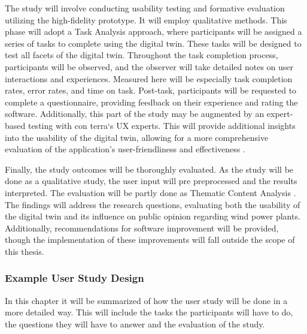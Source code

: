 \documentclass[11pt, titlepage, a4paper]{scrartcl}
\begin{document}
\begin{linenumbers}

    The study will involve conducting usability testing and formative evaluation utilizing the high-fidelity prototype. It will employ qualitative methods. This phase will adopt a Task Analysis approach, where participants will be assigned a series of tasks to complete using the digital twin. These tasks will be designed to test all facets of the digital twin. Throughout the task completion process, participants will be observed, and the observer will take detailed notes on user interactions and experiences. Measured here will be especially task completion rates, error rates, and time on task.
    Post-task, participants will be requested to complete a questionnaire, providing feedback on their experience and rating the software. Additionally, this part of the study may be augmented by an expert-based testing with con terra`s UX experts. This will provide additional insights into the usability of the digital twin, allowing for a more comprehensive evaluation of the application's user-friendliness and effectiveness \cite{lazarResearchMethodsHuman2017}.


    Finally, the study outcomes will be thoroughly evaluated. As the study will be done as a qualitative study, the user input will pre preprocessed and the results interpreted. The evaluation will be partly done as Thematic Content Analysis \cite{lazarResearchMethodsHuman2017}. The findings will address the research questions, evaluating both the usability of the digital twin and its influence on public opinion regarding wind power plants. Additionally, recommendations for software improvement will be provided, though the implementation of these improvements will fall outside the scope of this thesis.

    \subsubsection{Example User Study Design}
    In this chapter it will be summarized of how the user study will be done in a more detailed way. This will include the tasks the participants will have to do, the questions they will have to answer and the evaluation of the study.


\end{linenumbers}
\end{document}
